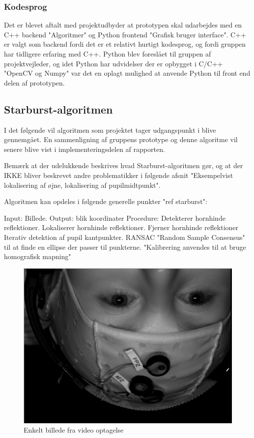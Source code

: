 \documentclass[rapport.tex]{subfiles}
\begin{document}
	
	
	\subsubsection{Kodesprog}
	Det er blevet aftalt med projektudbyder at prototypen skal udarbejdes med en C++ backend "Algoritmer" og Python frontend "Grafisk bruger interface".
	C++ er valgt som backend fordi det er et relativt hurtigt kodesprog, og fordi gruppen har tidligere erfaring
	med C++. Python blev foreslået til gruppen af projektvejleder, og idet Python har udvidelser der er opbygget
	i C/C++ "OpenCV og Numpy" var det en oplagt mulighed at anvende Python til front end delen af prototypen.
	                           
	\subsection{Starburst-algoritmen}
	I det følgende vil algoritmen som projektet tager udgangspunkt i blive gennemgået. En sammenligning af gruppens prototype og denne algoritme vil
	senere blive vist i implementeringsdelen af rapporten.
	
	Bemærk at der udelukkende beskrives hvad Starburst-algoritmen gør, og at der IKKE bliver beskrevet andre problematikker i følgende afsnit "Eksempelvist lokalisering af øjne, lokalisering af pupilmidtpunkt".
	
	Algoritmen kan opdeles i følgende generelle punkter "ref starburst":
	
	Input: Billede.
	Output: blik koordinater
	Procedure:
	Detekterer hornhinde reflektioner.
	Lokaliserer hornhinde reflektioner.
	Fjerner hornhinde reflektioner
	Iterativ detektion af pupil kantpunkter.
	RANSAC "Random Sample Consensus" til at finde en ellipse der passer til punkterne.
	"Kalibrering anvendes til at bruge homografisk mapning"
	
	\begin{figure}
	\centering
	\includegraphics[width=0.7\linewidth]{Billeder/InitialImage.png}
	\caption{Enkelt billede fra video optagelse}
	\label{fig:InitialImage}
	\end{figure}
	
\end{document}
